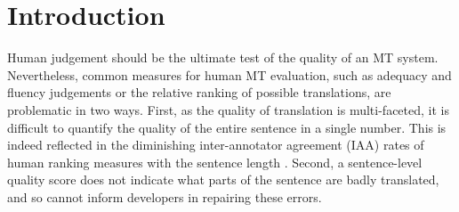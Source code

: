 \documentclass[11pt,letterpaper]{article}
\begin{document}
\begin{abstract}

\end{abstract}


\section{Introduction}\label{sec:intro}


Human judgement should be the ultimate test of the quality of an MT system.
Nevertheless, common measures for human MT evaluation, such as adequacy and fluency judgements
or the relative ranking of possible translations, are problematic in two ways.
First, as the quality of translation is multi-faceted, it is difficult
to quantify the quality of the entire sentence in a single number. This
is indeed reflected in the diminishing inter-annotator agreement (IAA) rates of human ranking measures
with the sentence length \cite{Bojar:2011}.
Second, a sentence-level quality score does not indicate what parts of the sentence
are badly translated, and so cannot inform developers in repairing these errors.
\end{document}
